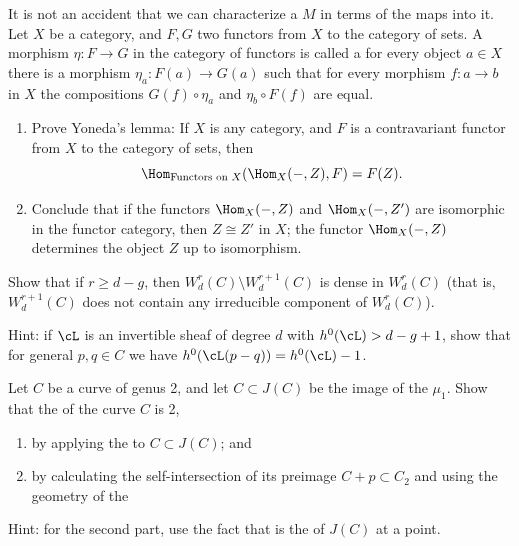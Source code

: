 \begin{exercise}\label{Yoneda}
It is not an accident that we can characterize a 
%
$M$ in terms of the maps into it. 
 Let $X$ be a category, and $F,G$ two functors from $X$ to the category of sets.
 A morphism $\eta: F\to G$ in the category of functors is called a 
%
 for every object $a\in X$ there is a morphism $\eta_a:F(a) \to G(a)$ such that for every
 morphism $f: a\to b$ in $X$ the compositions $G(f)\circ \eta_a$ and $\eta_b\circ F(f)$
 are equal. 
\begin{enumerate}
 \item Prove Yoneda's lemma: 
%
If $X$ is any category, and $F$ is a contravariant functor from $X$ to the category of sets, then 
 $$
 \Hom_{\hbox{\scriptsize Functors on $X$}}(\Hom_X( -, Z), F) = F(Z)
.
 $$
 \item Conclude that if the functors $\Hom_X( -, Z)$ and $\Hom_X( -, Z')$ are isomorphic in the functor category, 
 then $Z \cong Z'$ in $X$; 
the functor $\Hom_X( -, Z)$ determines the object $Z$ up to isomorphism.
 \end{enumerate}
\end{exercise}

\begin{exercise}
Show that if $r \geq d-g$, then $W^r_d(C) \setminus W^{r+1}_d(C)$ is
dense in $W^r_d(C)$ (that is, $W^{r+1}_d(C)$ does not contain any
irreducible component of $W^r_d(C)$).

Hint: if $\cL$ is an invertible sheaf of degree $d$ with $h^0(\cL) > d-g+1$, show that for general $p, q \in C$ we have $h^0(\cL(p-q))  = h^0(\cL) - 1$.
\end{exercise}

\begin{exercise}
Let $C$ be a curve of genus 2, and let $C \subset J(C)$ be the image
of the 
%
$\mu_1$. Show that the 
%
of the curve $C$ is 2,
\begin{enumerate}
\item by applying the 
%
 to $C \subset J(C)$; and
\item by calculating the self-intersection of its preimage 
$C + p \subset C_2$ and using the geometry of the 
\end{enumerate}

Hint: for the second part, use the fact that 
is the 
%
of $J(C)$ at a point.
\end{exercise}

